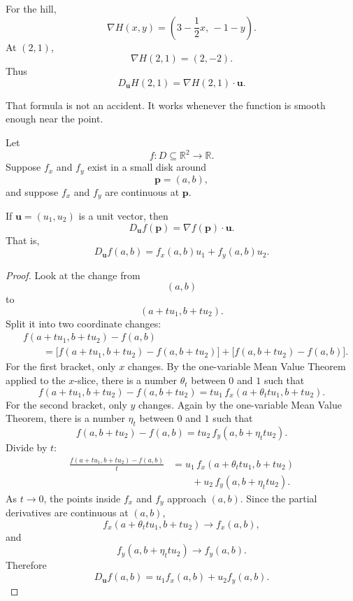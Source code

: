 For the hill,
\[
    \nabla H(x,y)=\left(3-\frac12x,\,-1-y\right).
\]
At \((2,1)\),
\[
    \nabla H(2,1)=(2,-2).
\]
Thus
\[
    D_{\mathbf u}H(2,1)
    =
    \nabla H(2,1)\cdot\mathbf u.
\]

That formula is not an accident.  It works whenever the function is smooth enough near
the point.

\begin{theorem}
Let
\[
    f:D\subseteq\mathbb R^2\to\mathbb R.
\]
Suppose \(f_x\) and \(f_y\) exist in a small disk around
\[
    \mathbf p=(a,b),
\]
and suppose \(f_x\) and \(f_y\) are continuous at \(\mathbf p\).

If \(\mathbf u=(u_1,u_2)\) is a unit vector, then
\[
\boxed{
    D_{\mathbf u}f(\mathbf p)
    =
    \nabla f(\mathbf p)\cdot\mathbf u.
}
\]
That is,
\[
\boxed{
    D_{\mathbf u}f(a,b)
    =
    f_x(a,b)u_1+f_y(a,b)u_2.
}
\]
\end{theorem}

\begin{proof}
Look at the change from
\[
    (a,b)
\]
to
\[
    (a+tu_1,b+tu_2).
\]
Split it into two coordinate changes:
\[
\begin{aligned}
&f(a+tu_1,b+tu_2)-f(a,b)\\
&\qquad =
\bigl[f(a+tu_1,b+tu_2)-f(a,b+tu_2)\bigr]
+
\bigl[f(a,b+tu_2)-f(a,b)\bigr].
\end{aligned}
\]
For the first bracket, only \(x\) changes.  By the one-variable Mean Value Theorem
applied to the \(x\)-slice, there is a number \(\theta_t\) between \(0\) and \(1\) such that
\[
    f(a+tu_1,b+tu_2)-f(a,b+tu_2)
    =
    tu_1\,f_x(a+\theta_ttu_1,b+tu_2).
\]
For the second bracket, only \(y\) changes.  Again by the one-variable Mean Value
Theorem, there is a number \(\eta_t\) between \(0\) and \(1\) such that
\[
    f(a,b+tu_2)-f(a,b)
    =
    tu_2\,f_y(a,b+\eta_ttu_2).
\]
Divide by \(t\):
\[
\begin{aligned}
\frac{f(a+tu_1,b+tu_2)-f(a,b)}{t}
&=
u_1\,f_x(a+\theta_ttu_1,b+tu_2)\\
&\qquad
+
u_2\,f_y(a,b+\eta_ttu_2).
\end{aligned}
\]
As \(t\to0\), the points inside \(f_x\) and \(f_y\) approach \((a,b)\).  Since the
partial derivatives are continuous at \((a,b)\),
\[
    f_x(a+\theta_ttu_1,b+tu_2)\to f_x(a,b),
\]
and
\[
    f_y(a,b+\eta_ttu_2)\to f_y(a,b).
\]
Therefore
\[
    D_{\mathbf u}f(a,b)=u_1f_x(a,b)+u_2f_y(a,b).
\]
\end{proof}

